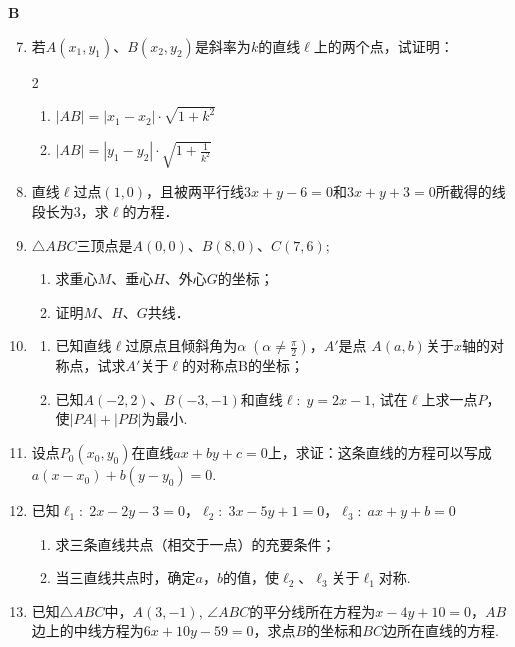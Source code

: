 \begin{center}
    \bfseries B
\end{center}

\begin{enumerate}\setcounter{enumi}{6}
    \item  若$A(x_1,y_1)$、$B(x_2,y_2)$是斜率为$k$的直线$\ell$上的两个点，试证明：
\begin{multicols}{2}
\begin{enumerate}[(1)] 
    \item $|AB|=|x_1-x_2|\cdot \sqrt{1+k^2}$
    \item $|AB|=|y_1-y_2|\cdot \sqrt{1+\frac{1}{k^2}}$
\end{enumerate}
\end{multicols}

    \item  直线$\ell$过点$(1,0)$，且被两平行线$3x+y-6=0$和$3x+y+3=0$所截得的线段长为3，求$\ell$的方程．
    \item $\triangle ABC$三顶点是$A(0,0)$、$B(8,0)$、$C(7,6)$;
\begin{enumerate}[(1)]
    \item 求重心$M$、垂心$H$、外心$G$的坐标；
    \item 证明$M$、$H$、$G$共线．
\end{enumerate}

    \item \begin{enumerate}[(1)]
        \item 已知直线$\ell$过原点且倾斜角为$\alpha\; \left(\alpha\ne \frac{\pi}{2}\right)$，$A'$是点
    $A(a,b)$关于$x$轴的对称点，试求$A'$关于$\ell$的对称点B的坐标；
    \item 已知$A(-2,2)$、$B(-3,-1)$和直线$\ell:\; y=2x-1$, 试在$\ell$上求一点$P$，使$|PA|+|PB|$为最小.
    \end{enumerate}

    \item  设点$P_0(x_0,y_0)$在直线$ax+by+c=0$上，求证：这条直线的方程可以写成$a(x-x_0)+b(y-y_0)=0$.
\item 已知$\ell_1:\; 2x-2y-3=0$，$\ell_2:\; 3x-5y+1=0$，$\ell_3:\; ax+y+b=0$
\begin{enumerate}[(1)]
    \item 求三条直线共点（相交于一点）的充要条件；
    \item 当三直线共点时，确定$a$，$b$的值，使$\ell_2$、$\ell_3$关于$\ell_1$对称.
\end{enumerate}

\item 已知$\triangle ABC$中，$A(3,-1)$, $\angle ABC$的平分线所在方程为$x-4y+10=0$，$AB$边上的中线方程为$6x+10y-59=0$，求点$B$的坐标和$BC$边所在直线的方程.
\end{enumerate}

